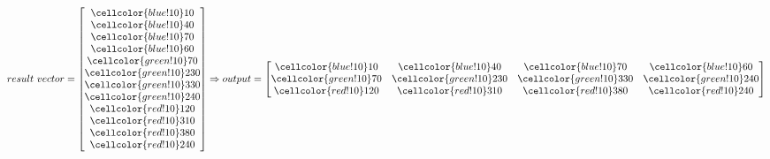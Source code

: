 \documentclass[11pt]{article}
\newcommand\x{\cellcolor{red!10}}
\newcommand\y{\cellcolor{green!10}}
\newcommand\z{\cellcolor{blue!10}}
\begin{document}
	\begin{equation}
	result \ vector = 
	\begin{bmatrix}
	\z 10\\ \z 40\\ \z 70\\ \z 60\\ \y 70\\ \y 230\\ \y 330\\ \y 240\\ \x 120\\ \x  310\\ \x 380\\ \x 240\\
	\end{bmatrix}
	\Rightarrow output= 
	\begin{bmatrix}
	\z 10 & \z 40 & \z 70 & \z 60\\
	\y 70 & \y 230 & \y 330 & \y 240\\
	\x 120 & \x  310 & \x 380 & \x 240\\
	\end{bmatrix}
	\end{equation}
	\vspace{10mm}
	
\end{document}
